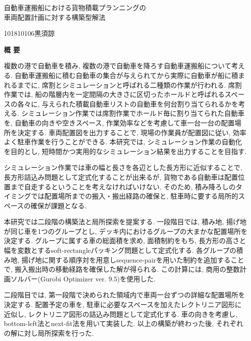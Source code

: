 \begin{center}
\begin{spacing}{1.3}
    {\LARGE 自動車運搬船における貨物積載プランニングの\\車両配置計画に対する構築型解法}\\[0.5cm]
\end{spacing}
\end{center}
\hfill
{\large 101810106\qquad 黒須諒}\\[0.5cm]
\begin{center}
{\Large \bf 概 要}\\
\end{center}

複数の港で自動車を積み, 複数の港で自動車を降ろす自動車運搬船について考える. 
自動車運搬船に積む自動車の集合が与えられてから実際に自動車が船に積まれるまでに, 席割とシミュレーションと呼ばれる二種類の作業が行われる. 
席割作業では, 船の階層内を一定間隔の大きさに区切ったホールドと呼ばれるスペースの各々に, 与えられた積載自動車リストの自動車を何台割り当てられるかを考える. 
シミュレーション作業では席割作業でホールド毎に割り当てられた自動車を, 自動車の向きや空きスペース, 作業効率などを考慮して車一台一台の配置場所を決定する. 
車両配置図を出力することで, 現場の作業員が配置図に従い, 効率よく駐車作業を行うことができる. 
本研究では, シミュレーション作業の自動化を目的とし, 短時間かつ実用的なシミュレーション結果を出力することを目指す. 

シミュレーション作業では車の幅と長さを各辺とした長方形に近似することで, 長方形詰込み問題として定式化することが出来るが, 貨物である自動車は配置位置まで自走するということを考えなければいけない. 
そのため, 積み降ろしのタイミングでは配置場所までの搬入・搬出経路の確保と, 駐車時に要する局所的スペースの確保が課題となる. 

本研究では二段階の構築法と局所探索を提案する. 
一段階目では, 積み地, 揚げ地が同じ車を1つのグループとし, デッキ内におけるグループの大まかな配置場所を決定する. 
グループに属する車の総面積を求め, 面積制約をもち, 長方形の高さと幅を変数とするsoft-rectangleパッキング問題として定式化する. 
各グループの積み地, 揚げ地に関する順序対を用意しsequence-pairを用いた制約を追加することで, 搬入搬出時の移動経路を確保した解が得られる. 
この計算には, 商用の整数計画ソルバー(Gurobi Optimizer ver. 9.5)を使用した.  

二段階目では, 第一段階で決められた領域内で車両一台ずつの詳細な配置場所を決定する. 
配置予定の車を, 駐車に必要なスペースを加えたレクトリニア図形に近似し, レクトリニア図形の詰込み問題として定式化する. 
車の向きを考慮し, bottom-left法とnext-fit法を用いて実装した. 
以上の構築が終わった後, それぞれの解に対し局所探索を行った.  

